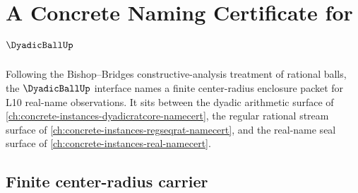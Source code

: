 \chapter{A Concrete Naming Certificate for $\DyadicBallUp$}
\label{ch:concrete-instances-dyadicball-namecert}

Following the Bishop--Bridges constructive-analysis treatment of rational
balls, the $\DyadicBallUp$ interface names a finite center-radius enclosure
packet for L10 real-name observations. It sits between the dyadic arithmetic
surface of \autoref{ch:concrete-instances-dyadicratcore-namecert}, the
regular rational stream surface of
\autoref{ch:concrete-instances-regseqrat-namecert}, and the real-name seal
surface of \autoref{ch:concrete-instances-real-namecert}.

\section{Finite center-radius carrier}
\label{sec:dyadicball-finite-center-radius-carrier}

